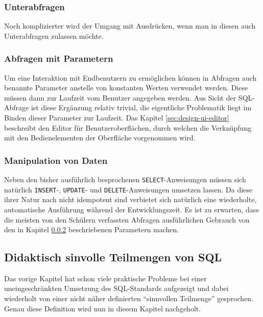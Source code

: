 \subsubsection{Unterabfragen}

Noch komplizierter wird der Umgang mit Ausdrücken, wenn man in diesen auch Unterabfragen zulassen möchte.


\subsubsection{Abfragen mit Parametern}
\label{sec:design-query-params}

Um eine Interaktion mit Endbenutzern zu ermöglichen können in Abfragen auch benannte Parameter anstelle von konstanten Werten verwendet werden. Diese müssen dann zur Laufzeit vom Benutzer angegeben werden. Aus Sicht der SQL-Abfrage ist diese Ergänzung relativ trivial, die eigentliche Problematik liegt im Binden dieser Parameter zur Laufzeit. Das Kapitel \ref{sec:design-ui-editor} beschreibt den Editor für Benutzeroberflächen, durch welchen die Verknüpfung mit den Bedienelementen der Oberfläche vorgenommen wird.

\subsubsection{Manipulation von Daten}

Neben den bisher ausführlich besprochenen \texttt{SELECT}-Anweisungen müssen sich natürlich \texttt{INSERT}-, \texttt{UPDATE}- und \texttt{DELETE}-Anweisungen umsetzen lassen. Da diese ihrer Natur nach nicht idempotent sind verbietet sich natürlich eine wiederholte, automatische Ausführung während der Entwicklungszeit. Es ist zu erwarten, dass die meisten von den Schülern verfassten Abfragen ausführlichen Gebrauch von den in Kapitel \ref{sec:design-query-params} beschriebenen Parametern machen.

\subsection{Didaktisch sinvolle Teilmengen von SQL}
\label{sec:sql-subset}

Das vorige Kapitel hat schon viele praktische Probleme bei einer uneingeschränkten Umsetzung des SQL-Standards aufgezeigt und dabei wiederholt von einer nicht näher definierten ``sinnvollen Teilmenge'' gesprochen. Genau diese Definition wird nun in diesem Kapitel nachgeholt.

